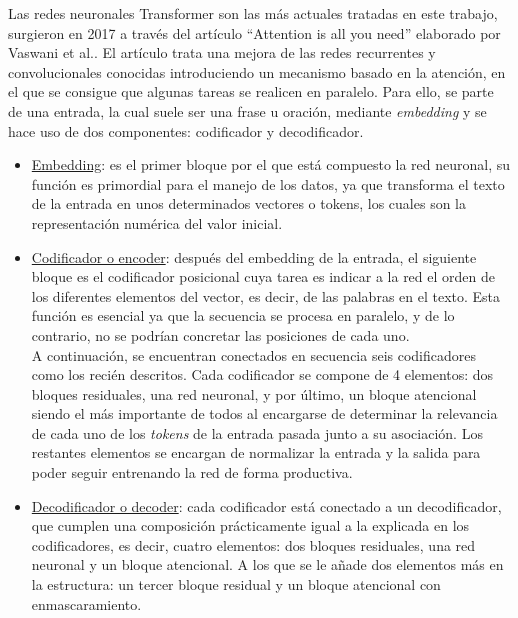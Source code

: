 Las redes neuronales Transformer son las más actuales tratadas en este trabajo, surgieron en 2017 a través del artículo “Attention is all you need” elaborado por Vaswani et al.. El artículo trata una mejora de las redes recurrentes y convolucionales conocidas introduciendo un mecanismo basado en la atención, en el que se consigue que algunas tareas se realicen en paralelo. Para ello, se parte de una entrada, la cual suele ser una frase u oración, mediante \textit{embedding} y se hace uso de dos componentes: codificador y decodificador. \\
\begin{itemize}
	\item \underline{Embedding}: es el primer bloque por el que está compuesto la red neuronal, su función es primordial para el manejo de los datos, ya que transforma el texto de la entrada en unos determinados vectores o tokens, los cuales son la representación numérica del valor inicial. \\
	\item \underline{Codificador o encoder}:  después del embedding de la entrada, el siguiente bloque es el codificador posicional cuya tarea es indicar a la red el orden de los diferentes elementos del vector, es decir, de las palabras en el texto. Esta función es esencial ya que la secuencia se procesa en paralelo, y de lo contrario, no se podrían concretar las posiciones de cada uno.\\
	
	A continuación, se encuentran conectados en secuencia seis codificadores como los recién descritos. Cada codificador se compone de 4 elementos: dos bloques residuales, una red neuronal, y por último, un bloque atencional siendo el más importante de todos al encargarse de determinar la relevancia de cada uno de los \textit{tokens} de la entrada pasada junto a su asociación. Los restantes elementos se encargan de normalizar la entrada y la salida para poder seguir entrenando la red de forma productiva. \\
	\item 
	\underline{Decodificador o decoder}: cada codificador está conectado a un decodificador, que cumplen una composición prácticamente igual a la explicada en los codificadores, es decir, cuatro elementos: dos bloques residuales, una red neuronal y un bloque atencional. A los que se le añade dos elementos más en la estructura: un tercer bloque residual y un bloque atencional con enmascaramiento. \\
	

\end{itemize}
